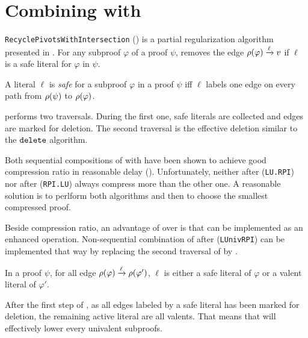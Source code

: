 \documentclass{llncs}
\begin{document}
\section{Combining {\LowerUnivalents} with {\RPI}} \label{sec:LUnivRPI}

\texttt{RecyclePivotsWithIntersection} ({\RPI}) is a partial regularization algorithm presented in
\cite{LURPI}. For any subproof $\varphi$ of a proof $\psi$, {\RPI} removes the edge $\rho(\varphi)
\xrightarrow{\ell} v$ if $\ell$ is a safe literal for $\varphi$ in $\psi$.

\begin{definition}
A literal $\ell$ is \emph{safe} for a subproof $\varphi$ in a proof $\psi$ iff $\ell$ labels one
edge on every path from $\rho(\psi)$ to $\rho(\varphi)$.
\end{definition}

{\RPI} performs two traversals. During the first one, safe literals are collected and edges are
marked for deletion. The second traversal is the effective deletion similar to the
$\FuncSty{delete}$ algorithm.

Both sequential compositions of {\LowerUnits} with {\RPI} have been shown to achieve good
compression ratio in reasonable delay (\cite{LURPI}). Unfortunately, neither {\LowerUnits} after
{\RPI} (\texttt{LU.RPI}) nor {\RPI} after {\LowerUnits} (\texttt{RPI.LU}) always compress more than
the other one. A reasonable solution is to perlform both algorithms and then to choose the smallest
compressed proof.

Beside compression ratio, an advantage of {\LowerUnivalents} over {\LowerUnits} is that
{\LowerUnivalents} can be implemented as an enhanced  operation.  Non-sequential
combination of {\LowerUnivalents} after {\RPI} (\texttt{LUnivRPI}) can be implemented that way by
replacing the second traversal of {\RPI} by {\LowerUnivalents}.

\begin{proposition} \label{prop:LunivRPI}
In a proof $\psi$, for all edge $\rho(\varphi) \xrightarrow{\ell} \rho(\varphi')$, $\ell$ is
either a safe literal of $\varphi$ or a valent literal of $\varphi'$.
\end{proposition}

After the first step of {\RPI}, as all edges labeled by a safe literal has been marked for deletion,
the remaining active literal are all valents. That means that {\LowerUnivalents} will effectively
lower every univalent subproofs.
\end{document}
